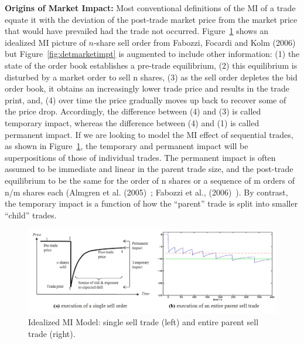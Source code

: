\noindent \textbf{Origins of Market Impact:} Most conventional definitions of the MI of a trade equate it with the deviation of the post-trade market price from the market price that would have prevailed had the trade not occurred. Figure~\ref{fig:marketimpt} shows an idealized MI picture of $n$-share sell order from Fabozzi, Focardi and Kolm (2006)~\cite{ffk} but Figure~\ref{fig:detmarketimpt} is augmented to include other information: (1) the state of the order book establishes a pre-trade equilibrium, (2) this equilibrium is disturbed by a market order to sell n shares, (3) as the sell order depletes the bid order book, it obtains an increasingly lower trade price and results in the trade print, and, (4) over time the price gradually moves up back to recover some of the price drop. Accordingly, the difference between (4) and (3) is called temporary impact, whereas the difference between (4) and (1) is called permanent impact. If we are looking to model the MI effect of sequential trades, as shown in Figure~\ref{fig:marketimpt}, the temporary and permanent impact will be superpositions of those of individual trades. The permanent impact is often assumed to be immediate and linear in the parent trade size, and the post-trade equilibrium to be the same for the order of n shares or a sequence of m orders of n/m shares each (Almgren et al. (2005)~\cite{athl}; Fabozzi et al., (2006)~\cite{ffk}). By contrast, the temporary impact is a function of how the ``parent'' trade is split into smaller ``child'' trades.
	\begin{figure}[!ht]
	\centering
	\includegraphics[width=\textwidth]{chapters/chapter_exec_models/figures/fig1ab.jpg}
	\caption{Idealized MI Model: single sell trade (left) and entire parent sell trade (right). \label{fig:marketimpt}}
	\end{figure}
